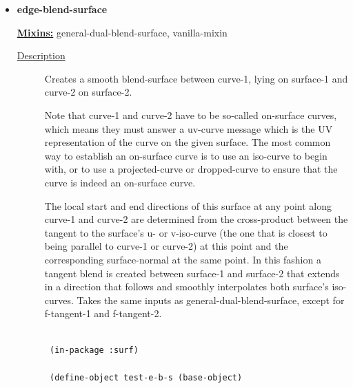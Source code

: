 \documentclass [11pt]{book}
\begin{document}
\begin{itemize}
\begin{description}
\end{description}







\item {}
\label{prim:edge-blend-surface}
\textbf{edge-blend-surface}


\textbf{
\underline{Mixins:}} general-dual-blend-surface, vanilla-mixin





\begin{description}

\item [
\underline{Description}]


Creates a smooth blend-surface between curve-1, lying on surface-1 and curve-2 on surface-2. 

Note that curve-1 and curve-2 have to be so-called on-surface curves, which means they must answer a uv-curve message which is the UV representation of the curve on the given surface. The most common way to establish an on-surface curve is to use an iso-curve to begin with, or to use a projected-curve or dropped-curve to ensure that the curve is indeed an on-surface curve.

The local start and end directions of this surface at any point along curve-1 and curve-2 are determined from the cross-product between the tangent to the surface's u- or v-iso-curve (the one that is closest to being parallel to curve-1 or curve-2) at this point and the corresponding surface-normal at the same point. In this fashion a tangent blend is created between surface-1 and surface-2 that extends in a direction that follows and smoothly interpolates both surface's iso-curves. Takes the same inputs as general-dual-blend-surface, except for f-tangent-1 and f-tangent-2.



\end{description}




\begin{figure}
\begin{lrbox}{\boxedverb}
\begin{minipage}{\linewidth}
{\small

\begin{verbatim}

 (in-package :surf)

 (define-object test-e-b-s (base-object)
  

\end{verbatim}}
\end{minipage}
\end{lrbox}
\end{figure}
\end{itemize}
\end{document}
